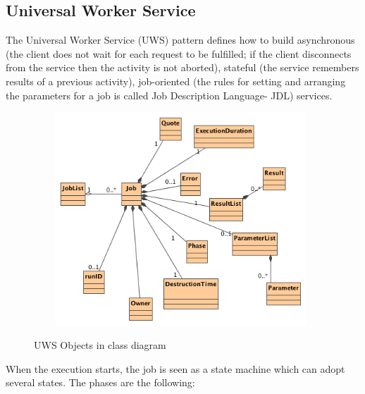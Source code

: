 \subsection{Universal Worker Service}

The Universal Worker Service (UWS) pattern defines how to build asynchronous (the client does not wait for each request to be fulfilled; if the client disconnects from the service then the activity is not aborted), stateful (the service remembers results of a previous activity), job-oriented (the rules for setting and arranging the parameters for a job is called Job Description Language- JDL) services.

\begin{figure}[H]
\centering
\includegraphics[width=11cm,height=8cm]{images/Class_Diagram__UWS__UWSObjects.png}\\
\caption{UWS Objects in class diagram}
\end{figure}

When the execution starts, the job is seen as a state machine which can adopt several states. The phases are the following:

